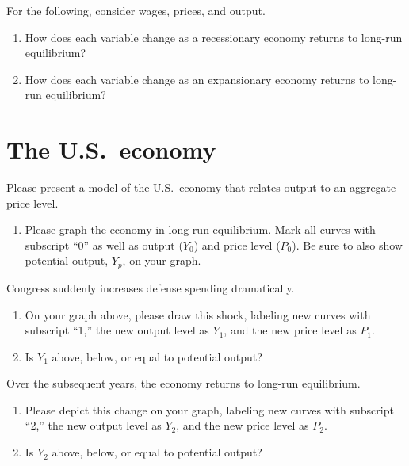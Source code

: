 \documentclass{assignment}
\begin{document}
For the following, consider wages, prices, and output.

\begin{enumerate}[resume]

\item How does each variable change as a recessionary economy returns to long-run equilibrium?

\vfill

\item How does each variable change as an expansionary economy returns to long-run equilibrium?

\vfill

\end{enumerate}

\vspace{-2.0\baselineskip}

\clearpage

\section{The U.S.~economy}

Please present a model of the U.S.~economy that relates output to an aggregate price level.

\begin{enumerate}

\item Please graph the economy in long-run equilibrium. Mark all curves with subscript ``0'' as well as output ($Y_0$) and price level ($P_0$). Be sure to also show potential output, $Y_p$, on your graph.

\vfill

\end{enumerate}

Congress suddenly increases defense spending dramatically.

\begin{enumerate}[resume]

\item On your graph above, please draw this shock, labeling new curves with subscript ``1,'' the new output level as $Y_1$, and the new price level as $P_1$.

\item Is $Y_1$ above, below, or equal to potential output? \hfill \underline{\hspace{3in}}

\end{enumerate}

Over the subsequent years, the economy returns to long-run equilibrium.

\begin{enumerate}[resume]

\item Please depict this change on your graph, labeling new curves with subscript ``2,'' the new output level as $Y_2$, and the new price level as $P_2$.

\item Is $Y_2$ above, below, or equal to potential output? \hfill \underline{\hspace{3in}}

\end{enumerate}
\end{document}
